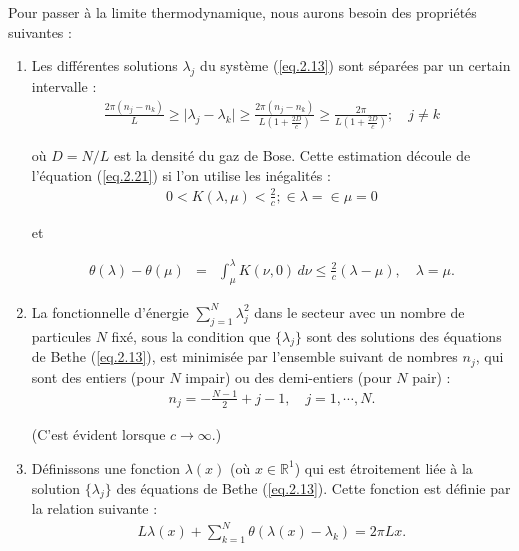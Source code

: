 Pour passer à la limite thermodynamique, nous aurons besoin des propriétés suivantes :

\begin{enumerate}
    \item Les différentes solutions \( \lambda_j \) du système (\ref{eq.2.13}) sont séparées par un certain intervalle :
    \begin{eqnarray}
    	\frac{2 \pi ( n_j - n_k )}{ L } \geq \vert \lambda_j - \lambda_k \vert \geq \frac{2 \pi ( n_j - n_k )}{ L ( 1 + \frac{2D}c )} \geq \frac{ 2 \pi }{ L ( 1 + \frac{2D}c )} ; \quad j \neq k 	
    \end{eqnarray}

    
    où \( D = N / L \) est la densité du gaz de Bose. Cette estimation découle de l'équation (\ref{eq.2.21}) si l'on utilise les inégalités :
    \begin{eqnarray}
    	0 < K(\lambda, \mu) < \frac{2}{c}; \in  \lambda = \in \mu = 0 	
    \end{eqnarray}

    et 
    
    \begin{eqnarray}
    	\theta( \lambda ) - \theta ( \mu ) & = & \int_\mu^\lambda K ( \nu , 0 ) \, d \nu \leq \frac{2}c ( \lambda - \mu ) , \quad \lambda = \mu .	
    \end{eqnarray}

    
    \item La fonctionnelle d'énergie \( \sum_{j = 1}^N \lambda_j^2  \) dans le secteur avec un nombre de particules \( N \) fixé, sous la condition que \( \{\lambda_j\} \) sont des solutions des équations de Bethe (\ref{eq.2.13}), est minimisée par l'ensemble suivant de nombres \( n_j \), qui sont des entiers (pour \( N \) impair) ou des demi-entiers (pour \( N \) pair) :
    \begin{eqnarray}
    	n_j = -\frac{N - 1}{2} + j - 1, \quad j = 1, \cdots, N.	
    \end{eqnarray}

    (C'est évident lorsque \( c \to \infty \).)
    
    \item Définissons une fonction \( \lambda(x) \) (où \( x \in \mathbb{R}^1 \)) qui est étroitement liée à la solution \( \{\lambda_j\} \) des équations de Bethe (\ref{eq.2.13}). Cette fonction est définie par la relation suivante :
    \begin{eqnarray}
    	L \lambda(x) + \sum_{k=1}^N \theta(\lambda(x) - \lambda_k) = 2 \pi L  x.	
    \end{eqnarray}


\end{enumerate}
